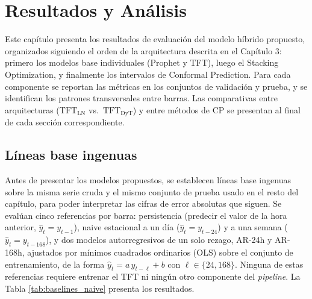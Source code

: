\chapter{Resultados y Análisis}

Este capítulo presenta los resultados de evaluación del modelo híbrido propuesto, organizados siguiendo el orden de la arquitectura descrita en el Capítulo 3: primero los modelos base individuales (Prophet y TFT), luego el Stacking Optimization, y finalmente los intervalos de Conformal Prediction. Para cada componente se reportan las métricas en los conjuntos de validación y prueba, y se identifican los patrones transversales entre barras. Las comparativas entre arquitecturas ($\text{TFT}_\text{LN}$ vs.\ $\text{TFT}_\text{DyT}$) y entre métodos de CP se presentan al final de cada sección correspondiente.

\section{Líneas base ingenuas}
\label{sec:baselines}

Antes de presentar los modelos propuestos, se establecen líneas base ingenuas sobre la misma serie cruda y el mismo conjunto de prueba usado en el resto del capítulo, para poder interpretar las cifras de error absolutas que siguen. Se evalúan cinco referencias por barra: persistencia (predecir el valor de la hora anterior, $\hat{y}_t = y_{t-1}$), naive estacional a un día ($\hat{y}_t = y_{t-24}$) y a una semana ($\hat{y}_t = y_{t-168}$), y dos modelos autorregresivos de un solo rezago, AR-24h y AR-168h, ajustados por mínimos cuadrados ordinarios (OLS) sobre el conjunto de entrenamiento, de la forma $\hat{y}_t = a\,y_{t-\ell} + b$ con $\ell \in \{24, 168\}$. Ninguna de estas referencias requiere entrenar el TFT ni ningún otro componente del \textit{pipeline}. La Tabla \ref{tab:baselines_naive} presenta los resultados.

